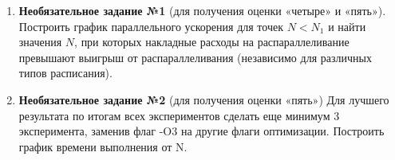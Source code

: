 \begin{enumerate}
     отчёт о проделанной работе.
     к устным вопросам на защите.
    \item\textbf{Необязательное задание №1} (для получения оценки «четыре» и «пять»). Построить график параллельного ускорения для точек $N < N_1$ и найти значения $N$, при которых накладные расходы на распараллеливание превышают выигрыш от распараллеливания (независимо для различных типов расписания).
    \item\textbf{Необязательное задание №2} (для получения оценки «пять») Для лучшего результата по итогам всех экспериментов сделать еще минимум 3 эксперимента, заменив флаг -O3 %
на другие флаги оптимизации. Построить график времени выполнения от N.
\end{enumerate}
